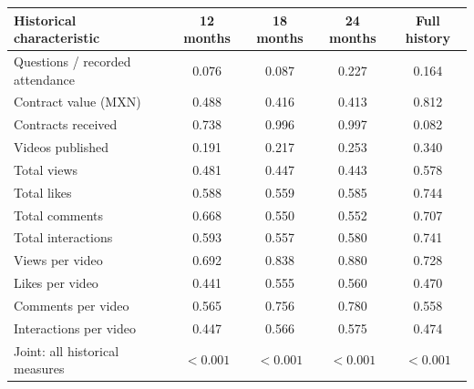 \begingroup\small
\setlength{\tabcolsep}{3pt}
\renewcommand{\arraystretch}{1.25}
\noindent%
\begin{tabular*}{\linewidth}{@{\extracolsep{\fill}}lcccc@{}}
\toprule
Historical characteristic & 12 months & 18 months & 24 months & Full history \\
\midrule
Questions / recorded attendance & 0.076 & 0.087 & 0.227 & 0.164 \\
\addlinespace
Contract value (MXN) & 0.488 & 0.416 & 0.413 & 0.812 \\
Contracts received & 0.738 & 0.996 & 0.997 & 0.082 \\
\addlinespace
Videos published & 0.191 & 0.217 & 0.253 & 0.340 \\
Total views & 0.481 & 0.447 & 0.443 & 0.578 \\
Total likes & 0.588 & 0.559 & 0.585 & 0.744 \\
Total comments & 0.668 & 0.550 & 0.552 & 0.707 \\
Total interactions & 0.593 & 0.557 & 0.580 & 0.741 \\
Views per video & 0.692 & 0.838 & 0.880 & 0.728 \\
Likes per video & 0.441 & 0.555 & 0.560 & 0.470 \\
Comments per video & 0.565 & 0.756 & 0.780 & 0.558 \\
Interactions per video & 0.447 & 0.566 & 0.575 & 0.474 \\
\midrule
Joint: all historical measures & $<0.001$ & $<0.001$ & $<0.001$ & $<0.001$ \\
\bottomrule
\end{tabular*}\par\endgroup
